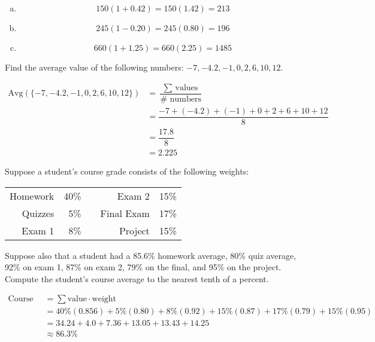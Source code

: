 \documentclass[12pt,letterpaper]{exam}
\begin{document}
\begin{questions}
\sol 
\begin{enumerate}[(a)]
\item 
	\[
	150(1 + 0.42)= 150(1.42)= 213
	\] \pspace

\item 
	\[
	245(1 - 0.20)= 245(0.80)= 196
	\] \pspace

\item 
	\[
	660(1 + 1.25)= 660(2.25)= 1485
	\]
\end{enumerate}



\newpage
\question[10] Find the average value of the following numbers: $-7, -4.2, -1, 0, 2, 6, 10, 12$. \pspace

	\[
	\begin{aligned}
	\text{Avg}(\{-7, -4.2, -1, 0, 2, 6, 10, 12\})&= \dfrac{\sum \text{ values}}{\# \text{ numbers}} \\[0.3cm]
	&= \dfrac{-7 + (-4.2) + (-1) + 0 + 2 + 6 + 10 + 12}{8} \\[0.3cm]
	&= \dfrac{17.8}{8} \\[0.3cm]
	&= 2.225
	\end{aligned}
	\]



\newpage
\question[10] Suppose a student's course grade consists of the following weights: \par
	\begin{table}[!ht]
	\centering
	\begin{tabular}{rrcrr}
	Homework & 40\% & & Exam 2 & 15\% \\
	Quizzes & 5\% & & Final Exam & 17\% \\
	Exam 1 & 8\% & & Project & 15\% \\
	\end{tabular}
	\end{table} \par
Suppose also that a student had a 85.6\% homework average, 80\% quiz average, 92\% on exam 1, 87\% on exam 2, 79\% on the final, and 95\% on the project. Compute the student's course average to the nearest tenth of a percent. \pspace

	\[
	\begin{aligned}
	\text{Course Average}&= \sum \text{value} \cdot \text{weight} \\[0.3cm]
	&= 40\% (0.856) + 5\% (0.80) + 8\% (0.92) + 15\% (0.87) + 17\% (0.79) + 15\% (0.95) \\[0.3cm]
	&= 34.24 + 4.0 + 7.36 + 13.05 + 13.43 + 14.25 \\[0.3cm]
	&\approx 86.3\%
	\end{aligned}
	\] 




\end{questions}
\end{document}
